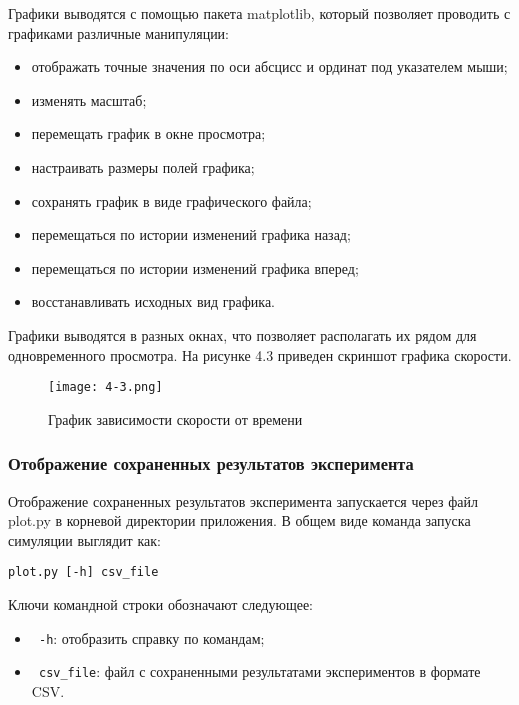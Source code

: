 Графики выводятся с помощью пакета matplotlib, который позволяет проводить с графиками различные манипуляции:

\begin{itemize}
	\item отображать точные значения по оси абсцисс и ординат под указателем мыши;
	\item изменять масштаб;
	\item перемещать график в окне просмотра;
	\item настраивать размеры полей графика;
	\item сохранять график в виде графического файла;
	\item перемещаться по истории изменений графика назад;
	\item перемещаться по истории изменений графика вперед;
	\item восстанавливать исходных вид графика.
\end{itemize}


Графики выводятся в разных окнах, что позволяет располагать их рядом для одновременного просмотра. На рисунке 4.3 приведен скриншот графика скорости.

\begin{figure}[ht]
  \centering
  \texttt{[image: 4-3.png]}
  \caption{График зависимости скорости от времени }
\end{figure}


\subsubsection{ Отображение сохраненных результатов эксперимента }

Отображение сохраненных результатов эксперимента запускается через файл plot.py в корневой директории приложения. В общем виде команда запуска симуляции выглядит как:


\begin{lstlisting}[style=pythonstyle,caption={  }, label=lst:func:1]
  plot.py [-h] csv_file
\end{lstlisting}

Ключи командной строки обозначают следующее:

\begin{itemize}
	\item \lstinline! -h!: отобразить справку по командам;
	\item \lstinline! csv_file!: файл с сохраненными результатами экспериментов в формате CSV.
\end{itemize}

